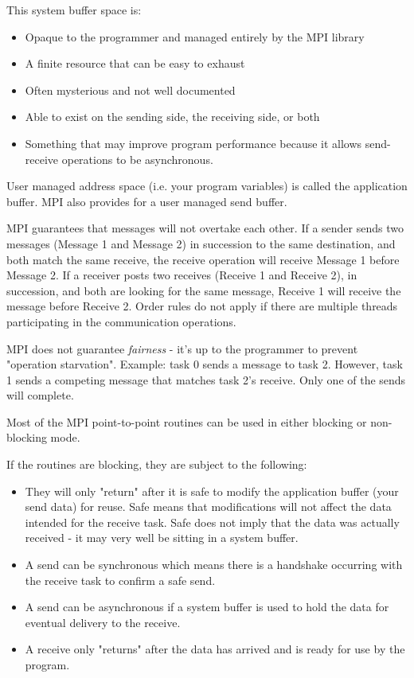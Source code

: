 This system buffer space is: 
\begin{itemize}
\item Opaque to the programmer and managed entirely by the MPI library 
\item A finite resource that can be easy to exhaust 
\item Often mysterious and not well documented 
\item Able to exist on the sending side, the receiving side, or both 
\item Something that may improve program performance because it allows send-receive operations to be asynchronous. 
\end{itemize}

User managed address space (i.e. your program variables) is called the application buffer. MPI also provides for a user managed send buffer. 

MPI guarantees that messages will not overtake each other. If a sender sends two messages (Message 1 and Message 2) in succession to the same destination, and both match the same receive, the receive operation will receive Message 1 before Message 2. If a receiver posts two receives (Receive 1 and Receive 2), in succession, and both are looking for the same message, Receive 1 will receive the message before Receive 2. Order rules do not apply if there are multiple threads participating in the communication operations. 

MPI does not guarantee \textit{fairness} - it's up to the programmer to prevent "operation starvation". Example: task 0 sends a message to task 2. However, task 1 sends a competing message that matches task 2's receive. Only one of the sends will complete. 

Most of the MPI point-to-point routines can be used in either blocking or non-blocking mode. 

If the routines are blocking, they are subject to the following:
\begin{itemize}
\item They will only "return" after it is safe to modify the application buffer (your send data) for reuse. Safe means that modifications will not affect the data intended for the receive task. Safe does not imply that the data was actually received - it may very well be sitting in a system buffer. 
\item A send can be synchronous which means there is a handshake occurring with the receive task to confirm a safe send. 
\item A send can be asynchronous if a system buffer is used to hold the data for eventual delivery to the receive. 
\item A receive only "returns" after the data has arrived and is ready for use by the program. 
\end{itemize}

